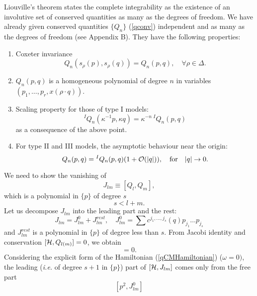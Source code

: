 \documentclass[a4paper,12pt]{article}
\begin{document}
Liouville's theorem states the complete integrability as the existence of an
involutive set of conserved quantities as many as the degrees of freedom.
We have already given conserved quantities \(\{Q_n\}\) (\ref{qconv})
independent and as many as the degrees of freedom (see Appendix B).
They have the following properties:
\begin{enumerate}
\item
Coxeter invariance
\begin{equation}
    Q_n(s_{\rho}(p),s_{\rho}(q))=Q_n(p,q),\quad \forall\rho\in\Delta.
\end{equation}
\item
\(Q_n(p,q)\) is a homogeneous polynomial of degree \(n\) in variables
\((p_1,\ldots,p_r,x(\rho\cdot q))\).
\item
Scaling property for those of type I models:
\begin{equation}
   {}^IQ_n(\kappa^{-1}p,\kappa q)=\kappa^{-n}\,{}^IQ_n(p,q)
\end{equation}
as a consequence of the above point.
\item
For type II and III models, the asymptotic behaviour near the origin:
\begin{equation}
   Q_n(p,q)={}^IQ_n(p,q)(1+{\cal O}(|q|)),\quad \mbox{for}\quad |q|\to0.
\end{equation}
\end{enumerate}
We need to show the vanishing of
\begin{equation}
J_{lm}\equiv [Q_l,Q_m],
\end{equation}
which is a polynomial in \(\{p\}\) of degree \(s\)
\begin{equation}
   s<l+m.
   \label{slesslm}
\end{equation}
Let us decompose \(J_{lm}\) into the leading part and the rest:
\begin{equation}
   J_{lm}=J_{lm}^0+J_{lm}^{rest},\quad
   J_{lm}^0=\sum c^{j_1,\ldots,j_s}(q)p_{j_1}\ldots p_{j_s}
\end{equation}
and \(J_{lm}^{rest}\) is a polynomial in \(\{p\}\)
of degree less than \(s\).
\noindent From Jacobi identity and conservation \([{\cal H}, Q_{l(m)}]=0\),
we obtain
\begin{equation}
   [{\cal H},J_{lm}]=0.
\end{equation}
Considering the explicit form of the Hamiltonian (\ref{qCMHamiltonian})
(\(\omega=0)\), the leading ({\em i.e.\/} of degree \(s+1\) in \(\{p\}\))
part
of \([{\cal H},J_{lm}]\) comes only from the free part
\[
   [p^2,J_{lm}^0]
\]
\end{document}
